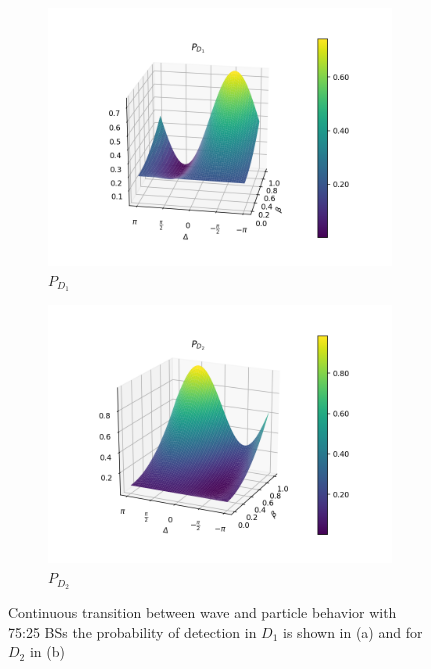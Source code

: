 \documentclass{book}
\begin{document}
\begin{figure}[H]
\centering
\begin{subfigure}[b]{0.40\linewidth}
\includegraphics[width=\linewidth]{images/pd1_2_pi3.png}
\caption{$P_{D_{1}}$}
\end{subfigure}
\begin{subfigure}[b]{0.40\linewidth}
\includegraphics[width=\linewidth]{images/pd2_2_pi3.png}
\caption{$P_{D_{2}}$ }
\label{fig:BS1}
\end{subfigure}
\caption{Continuous transition between wave and particle behavior with 75:25 BSs the probability of detection in $D_{1}$ is shown in (a) and for $D_{2}$ in (b)}
\label{pi/3}
\end{figure}
\end{document}
